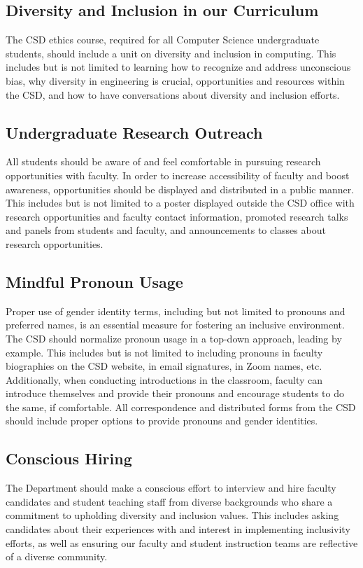 \documentclass{article}
\begin{document}
\subsection{Diversity and Inclusion in our Curriculum} 
The CSD ethics course, required for all Computer Science undergraduate students, 
should include a unit on diversity and inclusion in computing. 
This includes but is not limited to learning how to recognize and address unconscious bias, why diversity in 
engineering is crucial, opportunities and resources within the CSD, and how to have conversations about diversity 
and inclusion efforts. 

\subsection{Undergraduate Research Outreach} 
All students should be aware of and feel comfortable in pursuing 
research opportunities with faculty. In order to increase accessibility of faculty and boost awareness, 
opportunities should be displayed and distributed in a public manner. This includes but is not limited to a poster 
displayed outside the CSD office with research opportunities and faculty contact information, promoted research 
talks and panels from students and faculty, and announcements to classes about research opportunities.

\subsection{Mindful Pronoun Usage} 
Proper use of gender identity terms, including but not limited to pronouns and preferred names, 
is an essential measure for fostering an inclusive environment. The CSD should normalize pronoun usage in a 
top-down approach, leading by example. This includes but is not limited to including pronouns in faculty biographies 
on the CSD website, in email signatures, in Zoom names, etc. Additionally, when conducting introductions in the 
classroom, faculty can introduce themselves and provide their pronouns and encourage students to do the same, if 
comfortable. All correspondence and distributed forms from the CSD should include proper options to provide pronouns 
and gender identities. 

\subsection{Conscious Hiring} 
The Department should make a conscious effort to interview and hire faculty candidates and 
student teaching staff from diverse backgrounds who share a commitment to upholding diversity and inclusion values. 
This includes asking candidates about their experiences with and interest in implementing inclusivity efforts, as well 
as ensuring our faculty and student instruction teams are reflective of a diverse community. 
\end{document}
